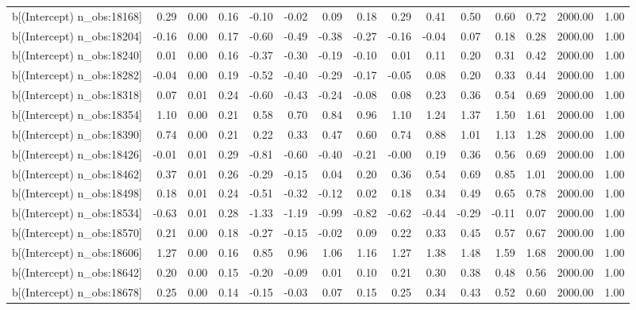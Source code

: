 \begin{table}[ht]
\begin{tabular}{rrrrrrrrrrrrrrr}
  b[(Intercept) n\_obs:18168] & 0.29 & 0.00 & 0.16 & -0.10 & -0.02 & 0.09 & 0.18 & 0.29 & 0.41 & 0.50 & 0.60 & 0.72 & 2000.00 & 1.00 \\ 
  b[(Intercept) n\_obs:18204] & -0.16 & 0.00 & 0.17 & -0.60 & -0.49 & -0.38 & -0.27 & -0.16 & -0.04 & 0.07 & 0.18 & 0.28 & 2000.00 & 1.00 \\ 
  b[(Intercept) n\_obs:18240] & 0.01 & 0.00 & 0.16 & -0.37 & -0.30 & -0.19 & -0.10 & 0.01 & 0.11 & 0.20 & 0.31 & 0.42 & 2000.00 & 1.00 \\ 
  b[(Intercept) n\_obs:18282] & -0.04 & 0.00 & 0.19 & -0.52 & -0.40 & -0.29 & -0.17 & -0.05 & 0.08 & 0.20 & 0.33 & 0.44 & 2000.00 & 1.00 \\ 
  b[(Intercept) n\_obs:18318] & 0.07 & 0.01 & 0.24 & -0.60 & -0.43 & -0.24 & -0.08 & 0.08 & 0.23 & 0.36 & 0.54 & 0.69 & 2000.00 & 1.00 \\ 
  b[(Intercept) n\_obs:18354] & 1.10 & 0.00 & 0.21 & 0.58 & 0.70 & 0.84 & 0.96 & 1.10 & 1.24 & 1.37 & 1.50 & 1.61 & 2000.00 & 1.00 \\ 
  b[(Intercept) n\_obs:18390] & 0.74 & 0.00 & 0.21 & 0.22 & 0.33 & 0.47 & 0.60 & 0.74 & 0.88 & 1.01 & 1.13 & 1.28 & 2000.00 & 1.00 \\ 
  b[(Intercept) n\_obs:18426] & -0.01 & 0.01 & 0.29 & -0.81 & -0.60 & -0.40 & -0.21 & -0.00 & 0.19 & 0.36 & 0.56 & 0.69 & 2000.00 & 1.00 \\ 
  b[(Intercept) n\_obs:18462] & 0.37 & 0.01 & 0.26 & -0.29 & -0.15 & 0.04 & 0.20 & 0.36 & 0.54 & 0.69 & 0.85 & 1.01 & 2000.00 & 1.00 \\ 
  b[(Intercept) n\_obs:18498] & 0.18 & 0.01 & 0.24 & -0.51 & -0.32 & -0.12 & 0.02 & 0.18 & 0.34 & 0.49 & 0.65 & 0.78 & 2000.00 & 1.00 \\ 
  b[(Intercept) n\_obs:18534] & -0.63 & 0.01 & 0.28 & -1.33 & -1.19 & -0.99 & -0.82 & -0.62 & -0.44 & -0.29 & -0.11 & 0.07 & 2000.00 & 1.00 \\ 
  b[(Intercept) n\_obs:18570] & 0.21 & 0.00 & 0.18 & -0.27 & -0.15 & -0.02 & 0.09 & 0.22 & 0.33 & 0.45 & 0.57 & 0.67 & 2000.00 & 1.00 \\ 
  b[(Intercept) n\_obs:18606] & 1.27 & 0.00 & 0.16 & 0.85 & 0.96 & 1.06 & 1.16 & 1.27 & 1.38 & 1.48 & 1.59 & 1.68 & 2000.00 & 1.00 \\ 
  b[(Intercept) n\_obs:18642] & 0.20 & 0.00 & 0.15 & -0.20 & -0.09 & 0.01 & 0.10 & 0.21 & 0.30 & 0.38 & 0.48 & 0.56 & 2000.00 & 1.00 \\ 
  b[(Intercept) n\_obs:18678] & 0.25 & 0.00 & 0.14 & -0.15 & -0.03 & 0.07 & 0.15 & 0.25 & 0.34 & 0.43 & 0.52 & 0.60 & 2000.00 & 1.00 \\ 

\end{tabular}
\end{table}
